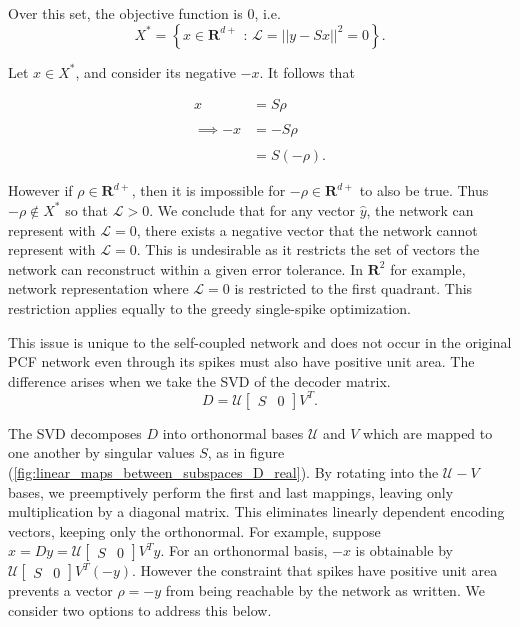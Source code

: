 \begin{enumerate}
Over this set, the objective function is 0, i.e. 
$$
X^* = \left\{x \in  \mathbf{R}^{d+} \, \ : \, \mathcal{L}=||y-Sx||^2 = 0 \right\}. 
$$

Let $x \in X^*$, and consider its negative $-x$. It follows that 

\begin{align*}
x &= S\rho
\\
\\
\implies -x &= -S \rho
\\
\\
&= S \left(-\rho\right). 
\end{align*}

However if $\rho \in \mathbf{R}^{d+}$, then it is impossible for $-\rho \in \mathbf{R}^{d+}$ to also be true. Thus $-\rho \not\in X^*$ so that $\mathcal{L} > 0$. We conclude that for any vector $\hat{y}$, the network can represent with $\mathcal{L}=0$, there exists a negative vector that the network cannot represent with $\mathcal{L}=0$. This is undesirable as it restricts the set of vectors the network can reconstruct within a given error tolerance. In $\mathbf{R}^2$ for example, network representation where $\mathcal{L} = 0$ is restricted to the first quadrant. This restriction applies equally to the greedy single-spike optimization. 

This issue is unique to the self-coupled network and does not occur in the original PCF network even through its spikes must also have positive unit area. The difference arises when we take the SVD of the decoder matrix.
$$
D = \mathcal{U} \begin{bmatrix} S & 0 \end{bmatrix} V^T.
$$ 

The SVD decomposes $D$ into orthonormal bases $\mathcal{U}$ and $V$ which are mapped to one another by singular values $S$, as in figure (\ref{fig:linear_maps_between_subspaces_D_real}). By rotating into the $\mathcal{U}-V$ bases, we preemptively perform the first and last mappings, leaving only multiplication by a diagonal matrix. This eliminates linearly dependent encoding vectors, keeping only the orthonormal. For example, suppose $x = Dy = \mathcal{U} \begin{bmatrix} S & 0 \end{bmatrix} V^T y$. For an orthonormal basis, $-x$ is obtainable by $\mathcal{U} \begin{bmatrix} S & 0 \end{bmatrix} V^T (-y)$. However the constraint that spikes have positive unit area prevents a vector $\rho=-y$ from being reachable by the network as written. We consider two options to address this below.  





\end{enumerate}
